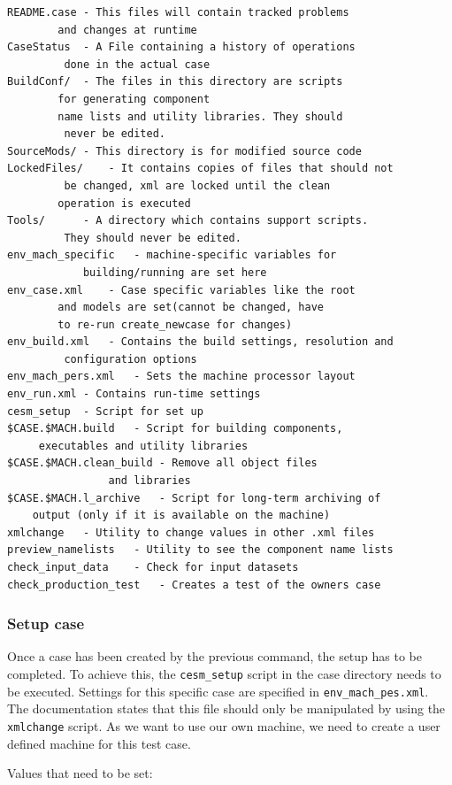 \documentclass[]{article}
\begin{document}
\begin{verbatim}
README.case - This files will contain tracked problems
        and changes at runtime
CaseStatus  - A File containing a history of operations
         done in the actual case
BuildConf/  - The files in this directory are scripts
        for generating component 
        name lists and utility libraries. They should
         never be edited.
SourceMods/ - This directory is for modified source code
LockedFiles/    - It contains copies of files that should not
         be changed, xml are locked until the clean 
        operation is executed
Tools/      - A directory which contains support scripts.
         They should never be edited.
env_mach_specific   - machine-specific variables for 
            building/running are set here
env_case.xml    - Case specific variables like the root 
        and models are set(cannot be changed, have
        to re-run create_newcase for changes)
env_build.xml   - Contains the build settings, resolution and
         configuration options
env_mach_pers.xml   - Sets the machine processor layout
env_run.xml - Contains run-time settings
cesm_setup  - Script for set up
$CASE.$MACH.build   - Script for building components,
     executables and utility libraries
$CASE.$MACH.clean_build - Remove all object files 
                and libraries
$CASE.$MACH.l_archive   - Script for long-term archiving of
    output (only if it is available on the machine)
xmlchange   - Utility to change values in other .xml files
preview_namelists   - Utility to see the component name lists
check_input_data    - Check for input datasets
check_production_test   - Creates a test of the owners case
\end{verbatim}

\subsubsection{Setup case}\label{setup-case}

Once a case has been created by the previous command, the setup has to
be completed. To achieve this, the \texttt{cesm\_setup} script in the
case directory needs to be executed. Settings for this specific case are
specified in \texttt{env\_mach\_pes.xml}. The documentation states that
this file should only be manipulated by using the \texttt{xmlchange}
script. As we want to use our own machine, we need to create a user
defined machine for this test case.

Values that need to be set:
\end{document}
